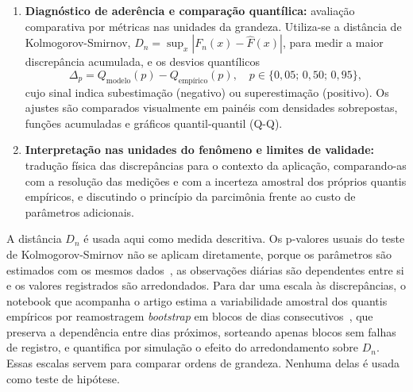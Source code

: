 \begin{enumerate}
    \item \textbf{Diagnóstico de aderência e comparação quantílica:} avaliação comparativa por métricas nas unidades da grandeza. Utiliza-se a distância de Kolmogorov-Smirnov, $D_n = \sup_x |F_n(x) - \widehat{F}(x)|$, para medir a maior discrepância acumulada, e os desvios quantílicos
    \begin{equation}
        \Delta_p = Q_{\text{modelo}}(p) - Q_{\text{empírico}}(p), \quad p \in \{0,05;\, 0,50;\, 0,95\},
        \label{eq:delta}
    \end{equation}
    cujo sinal indica subestimação (negativo) ou superestimação (positivo). Os ajustes são comparados visualmente em painéis com densidades sobrepostas, funções acumuladas e gráficos quantil-quantil (Q-Q).

    \item \textbf{Interpretação nas unidades do fenômeno e limites de validade:} tradução física das discrepâncias para o contexto da aplicação, comparando-as com a resolução das medições e com a incerteza amostral dos próprios quantis empíricos, e discutindo o princípio da parcimônia frente ao custo de parâmetros adicionais.
\end{enumerate}

A distância $D_n$ é usada aqui como medida descritiva. Os p-valores usuais do teste de Kolmogorov-Smirnov não se aplicam diretamente, porque os parâmetros são estimados com os mesmos dados~\cite{lilliefors1967}, as observações diárias são dependentes entre si e os valores registrados são arredondados. Para dar uma escala às discrepâncias, o notebook que acompanha o artigo estima a variabilidade amostral dos quantis empíricos por reamostragem \textit{bootstrap} em blocos de dias consecutivos~\cite{kunsch1989}, que preserva a dependência entre dias próximos, sorteando apenas blocos sem falhas de registro, e quantifica por simulação o efeito do arredondamento sobre $D_n$. Essas escalas servem para comparar ordens de grandeza. Nenhuma delas é usada como teste de hipótese.

